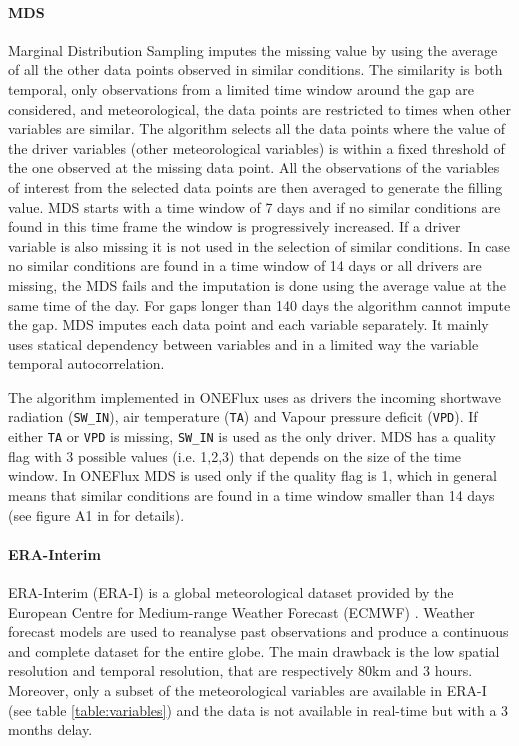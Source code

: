 \documentclass{article}
\begin{document}
\paragraph{MDS} Marginal Distribution Sampling \cite{reichstein_separation_2005-3} imputes the missing value by using the average of all the other data points observed in similar conditions. The similarity is both temporal, only observations from a limited time window around the gap are considered, and meteorological, the data points are restricted to times when other variables are similar. 
The algorithm selects all the data points where the value of the driver variables (other meteorological variables) is within a fixed threshold of the one observed at the missing data point. All the observations of the variables of interest from the selected data points are then averaged to generate the filling value. MDS starts with a time window of 7 days and if no similar conditions are found in this time frame the window is progressively increased. If a driver variable is also missing it is not used in the selection of similar conditions. 
In case no similar conditions are found in a time window of 14 days or all drivers are missing, the MDS fails and the imputation is done using the average value at the same time of the day. For gaps longer than 140 days the algorithm cannot impute the gap.
MDS imputes each data point and each variable separately. It mainly uses statical dependency between variables and in a limited way the variable temporal autocorrelation. 

The algorithm implemented in \textsf{ONEFlux} uses as drivers the incoming shortwave radiation (\texttt{SW\_IN}), air temperature (\texttt{TA}) and Vapour pressure deficit (\texttt{VPD}). If either \texttt{TA} or \texttt{VPD} is missing, \texttt{SW\_IN} is used as the only driver. 
MDS has a quality flag with 3 possible values (i.e. 1,2,3) that depends on the size of the time window. In \textsf{ONEFlux} MDS is used only if the quality flag is 1, which in general means that similar conditions are found in a time window smaller than 14 days (see figure A1 in  \textcite{reichstein_separation_2005-3} for details). 

\paragraph{ERA-Interim} ERA-Interim (ERA-I) is a global meteorological dataset provided by the European Centre for Medium-range Weather Forecast (ECMWF) \cite{dee_era-interim_2011}. Weather forecast models are used to reanalyse past observations and produce a continuous and complete dataset for the entire globe. The main drawback is the low spatial resolution and temporal resolution, that are respectively 80km and 3 hours. Moreover, only a subset of the meteorological variables are available in ERA-I (see table \ref{table:variables}) and the data is not available in real-time but with a 3 months delay.
\end{document}
